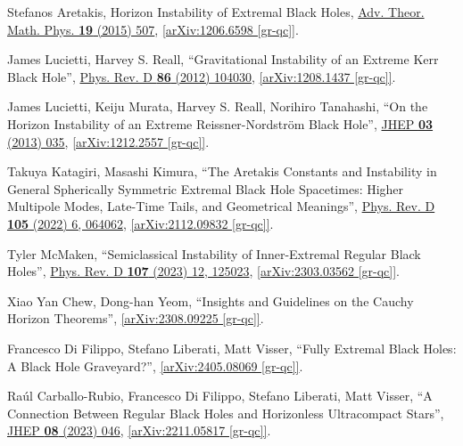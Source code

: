 \documentclass[12pt,preprintnumbers, floatfix, preprintnumbers, letterpaper, superscriptaddress,nofootinbib]{revtex4-2}
\begin{document}
\begin{thebibliography}{99}
Stefanos Aretakis, Horizon Instability of Extremal Black Holes, {\hypersetup{urlcolor=vividviolet}\href{https://www.intlpress.com/site/pub/pages/journals/items/atmp/content/vols/0019/0003/a001/}{Adv. Theor. Math. Phys. \textbf{19} (2015) 507}}, \href{https://arxiv.org/abs/1206.6598}{[arXiv:1206.6598 [gr-qc]]}.

James Lucietti, Harvey S. Reall, ``Gravitational Instability of an Extreme Kerr Black Hole'', {\hypersetup{urlcolor=vividviolet}\href{https://journals.aps.org/prd/abstract/10.1103/PhysRevD.86.104030}{Phys. Rev. D \textbf{86} (2012) 104030}}, \href{https://arxiv.org/abs/1208.1437}{[arXiv:1208.1437 [gr-qc]]}.

James Lucietti, Keiju Murata, Harvey S. Reall, Norihiro Tanahashi, ``On the Horizon Instability of an Extreme Reissner-Nordström Black Hole'', {\hypersetup{urlcolor=vividviolet}\href{https://link.springer.com/article/10.1007/JHEP03(2013)035}{JHEP \textbf{03} (2013) 035}}, \href{https://arxiv.org/abs/1212.2557}{[arXiv:1212.2557 [gr-qc]]}. 

Takuya Katagiri, Masashi Kimura, ``The Aretakis Constants and Instability in General Spherically Symmetric Extremal Black Hole Spacetimes: Higher Multipole Modes, Late-Time Tails, and Geometrical Meanings'', {\hypersetup{urlcolor=vividviolet}\href{https://journals.aps.org/prd/abstract/10.1103/PhysRevD.105.064062}{Phys. Rev. D \textbf{105} (2022) 6, 064062}}, \href{https://arxiv.org/abs/2112.09832}{[arXiv:2112.09832 [gr-qc]]}.

Tyler McMaken, ``Semiclassical Instability of Inner-Extremal Regular Black Holes'', {\hypersetup{urlcolor=vividviolet}\href{https://journals.aps.org/prd/abstract/10.1103/PhysRevD.107.125023}{Phys. Rev. D \textbf{107} (2023) 12, 125023}}, \href{https://arxiv.org/abs/2303.03562}{[arXiv:2303.03562 [gr-qc]]}.

Xiao Yan Chew, Dong-han Yeom, ``Insights and Guidelines on the Cauchy Horizon Theorems'', \href{https://arxiv.org/abs/2308.09225}{[arXiv:2308.09225 [gr-qc]]}.

Francesco Di Filippo, Stefano Liberati, Matt Visser, ``Fully Extremal Black Holes: A Black Hole Graveyard?'', \href{https://arxiv.org/abs/2405.08069}{[arXiv:2405.08069 [gr-qc]]}.

Raúl Carballo-Rubio, Francesco Di Filippo, Stefano Liberati, Matt Visser, ``A Connection Between Regular Black Holes and Horizonless Ultracompact Stars'', {\hypersetup{urlcolor=vividviolet}\href{https://link.springer.com/article/10.1007/JHEP08(2023)046}{JHEP \textbf{08} (2023) 046}}, \href{https://arxiv.org/abs/2211.05817}{[arXiv:2211.05817 [gr-qc]]}.


\end{thebibliography}
\end{document}
